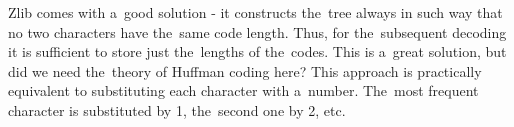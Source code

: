 Zlib comes with a~good solution - it constructs the~tree always in such way that no two characters have the~same code length. Thus, for the~subsequent decoding it is sufficient to store just the~lengths of the~codes. This is a~great solution, but did we need the~theory of Huffman coding here? This approach is practically equivalent to substituting each character with a~number. The~most frequent character is substituted by 1, the~second one by 2, etc.  


